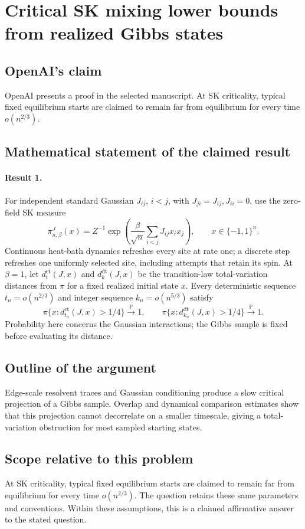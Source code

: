 \documentclass[11pt]{article}
\begin{document}
\section*{Critical SK mixing lower bounds from realized Gibbs states}

\subsection{OpenAI's claim}
OpenAI presents a proof in the selected manuscript. At SK criticality, typical fixed equilibrium starts are claimed to remain far from equilibrium for every time $o(n^{2/3})$.

\subsection{Mathematical statement of the claimed result}
\paragraph{Result 1.} For independent standard Gaussian $J_{ij}$, $i<j$, with $J_{ji}=J_{ij},J_{ii}=0$, use the zero-field SK measure
\[
 \pi_{n,\beta}^J(x)=Z^{-1}\exp\left(\frac\beta{\sqrt n}\sum_{i<j}J_{ij}x_ix_j\right),\qquad x\in\{-1,1\}^n.
\]
Continuous heat-bath dynamics refreshes every site at rate one; a discrete step refreshes one uniformly selected site, including attempts that retain its spin. At $\beta=1$, let $d_t^{\mathrm{ct}}(J,x)$ and $d_k^{\mathrm{dt}}(J,x)$ be the transition-law total-variation distances from $\pi$ for a fixed realized initial state $x$. Every deterministic sequence $t_n=o(n^{2/3})$ and integer sequence $k_n=o(n^{5/3})$ satisfy
\[
 \pi\{x:d_{t_n}^{\mathrm{ct}}(J,x)>1/4\}\xrightarrow{\mathbb P}1,\qquad
 \pi\{x:d_{k_n}^{\mathrm{dt}}(J,x)>1/4\}\xrightarrow{\mathbb P}1.
\]
Probability here concerns the Gaussian interactions; the Gibbs sample is fixed before evaluating its distance.

\subsection{Outline of the argument}
Edge-scale resolvent traces and Gaussian conditioning produce a slow critical projection of a Gibbs sample. Overlap and dynamical comparison estimates show that this projection cannot decorrelate on a smaller timescale, giving a total-variation obstruction for most sampled starting states.

\subsection{Scope relative to this problem}
At SK criticality, typical fixed equilibrium starts are claimed to remain far from equilibrium for every time $o(n^{2/3})$. The question retains these same parameters and conventions. Within these assumptions, this is a claimed affirmative answer to the stated question.
\end{document}
